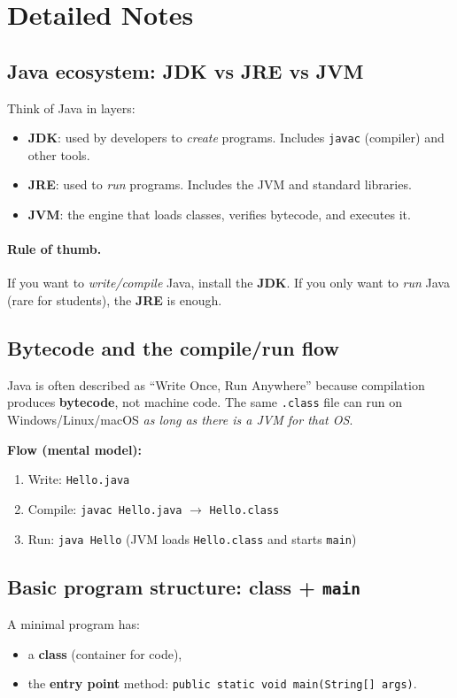 \documentclass[11pt]{article}
\begin{document}
\section{Detailed Notes}
\subsection{Java ecosystem: JDK vs JRE vs JVM}
Think of Java in layers:
\begin{itemize}
  \item \textbf{JDK}: used by developers to \emph{create} programs. Includes \texttt{javac} (compiler) and other tools.
  \item \textbf{JRE}: used to \emph{run} programs. Includes the JVM and standard libraries.
  \item \textbf{JVM}: the engine that loads classes, verifies bytecode, and executes it.
\end{itemize}

\paragraph{Rule of thumb.} If you want to \emph{write/compile} Java, install the \textbf{JDK}. If you only want to \emph{run} Java (rare for students), the \textbf{JRE} is enough.

\subsection{Bytecode and the compile/run flow}
Java is often described as ``Write Once, Run Anywhere'' because compilation produces \textbf{bytecode}, not machine code.
The same \texttt{.class} file can run on Windows/Linux/macOS \emph{as long as there is a JVM for that OS}.

\textbf{Flow (mental model):}
\begin{enumerate}
  \item Write: \texttt{Hello.java}
  \item Compile: \texttt{javac Hello.java} $\rightarrow$ \texttt{Hello.class}
  \item Run: \texttt{java Hello} (JVM loads \texttt{Hello.class} and starts \texttt{main})
\end{enumerate}

\subsection{Basic program structure: class + \texttt{main}}
A minimal program has:
\begin{itemize}
  \item a \textbf{class} (container for code),
  \item the \textbf{entry point} method: \texttt{public static void main(String[] args)}.
\end{itemize}
\end{document}
